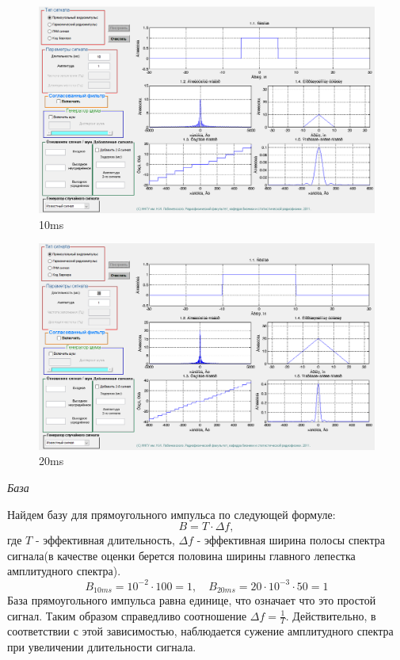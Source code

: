 \begin{figure}[H]
    \centering
    \includegraphics[width=0.9\linewidth]{imgs/t1s1_10.png}
    \caption{10ms}
    \label{fig:task1_10}
\end{figure}
\begin{figure}[H]
    \centering
    \includegraphics[width=0.9\linewidth]{imgs/t1s1_20.png}
    \caption{20ms}
    \label{fig:task1_20}
\end{figure}

\textit{База}

Найдем базу для прямоугольного импульса по следующей формуле: 
\begin{equation}
    B = T \cdot \Delta f,
    \label{eq:p:1}
\end{equation}
где $T$ - эффективная длительность, $\Delta f$ - эффективная ширина полосы спектра
сигнала(в качестве оценки берется половина ширины главного лепестка амплитудного спектра).
\begin{equation}
    B_{10ms} = 10^{-2} \cdot 100 = 1, \quad B_{20ms} = 20 \cdot 10^{-3} \cdot 50 = 1
    \label{eq:}
\end{equation}
База прямоугольного импульса равна единице, что означает что это простой сигнал. Таким образом
справедливо соотношение $\Delta f = \frac{1}{T}$. Действительно, в соответствии с этой зависимостью,
наблюдается сужение амплитудного спектра при увеличении длительности сигнала.

